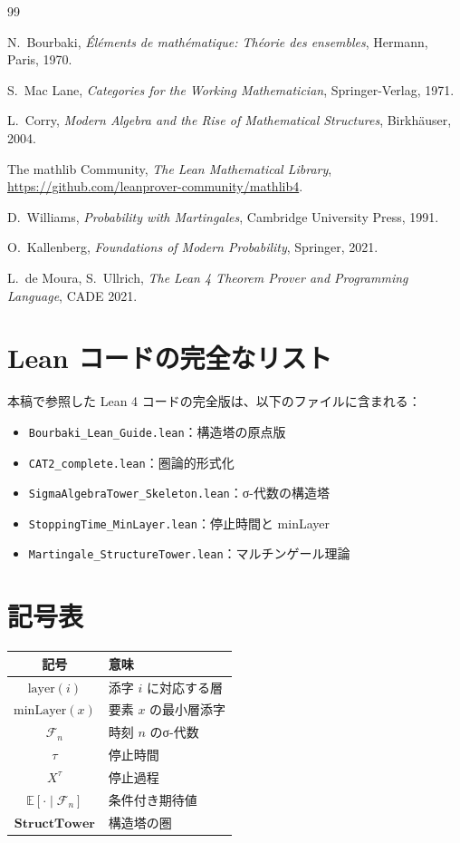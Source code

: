 \documentclass[11pt,a4paper]{article}
\theoremstyle{plain}
\theoremstyle{definition}
\newcommand{\FF}{\mathcal{F}}
\newcommand{\EE}{\mathbb{E}}
\newcommand{\StructTower}{\mathbf{StructTower}}
\newcommand{\minLayer}{\mathrm{minLayer}}
\newcommand{\layer}{\mathrm{layer}}
\begin{document}
\begin{thebibliography}{99}

N.~Bourbaki,
\textit{Éléments de mathématique: Théorie des ensembles},
Hermann, Paris, 1970.

S.~Mac Lane,
\textit{Categories for the Working Mathematician},
Springer-Verlag, 1971.

L.~Corry,
\textit{Modern Algebra and the Rise of Mathematical Structures},
Birkhäuser, 2004.

The mathlib Community,
\textit{The Lean Mathematical Library},
\url{https://github.com/leanprover-community/mathlib4}.

D.~Williams,
\textit{Probability with Martingales},
Cambridge University Press, 1991.

O.~Kallenberg,
\textit{Foundations of Modern Probability},
Springer, 2021.

L.~de Moura, S.~Ullrich,
\textit{The Lean 4 Theorem Prover and Programming Language},
CADE 2021.

\end{thebibliography}

\appendix

\section{Lean コードの完全なリスト}
\label{app:code}

本稿で参照した Lean 4 コードの完全版は、以下のファイルに含まれる：
\begin{itemize}
  \item \texttt{Bourbaki\_Lean\_Guide.lean}：構造塔の原点版
  \item \texttt{CAT2\_complete.lean}：圏論的形式化
  \item \texttt{SigmaAlgebraTower\_Skeleton.lean}：σ-代数の構造塔
  \item \texttt{StoppingTime\_MinLayer.lean}：停止時間と minLayer
  \item \texttt{Martingale\_StructureTower.lean}：マルチンゲール理論
\end{itemize}

\section{記号表}
\label{app:notation}

\begin{center}
\begin{tabular}{cl}
\hline
記号 & 意味 \\
\hline
$\layer(i)$ & 添字 $i$ に対応する層 \\
$\minLayer(x)$ & 要素 $x$ の最小層添字 \\
$\FF_n$ & 時刻 $n$ のσ-代数 \\
$\tau$ & 停止時間 \\
$X^\tau$ & 停止過程 \\
$\EE[\cdot \mid \FF_n]$ & 条件付き期待値 \\
$\StructTower$ & 構造塔の圏 \\
\hline
\end{tabular}
\end{center}
\end{document}
